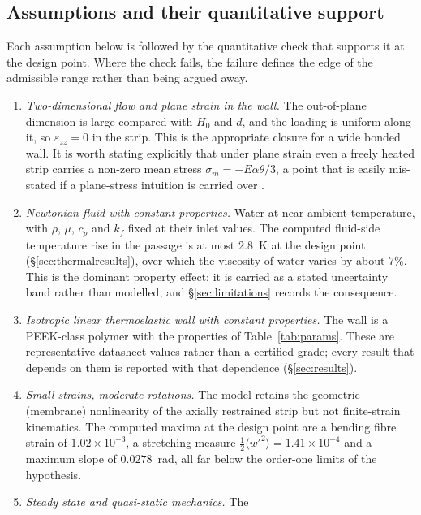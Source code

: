 \documentclass[11pt,a4paper]{article}
\newcommand{\eps}{\varepsilon}
\begin{document}
\subsection{Assumptions and their quantitative support}
\label{sec:assumptions}

Each assumption below is followed by the quantitative check that supports it
at the design point. Where the check fails, the failure defines the edge of
the admissible range rather than being argued away.

\begin{enumerate}
\item[\textbf{A1}] \emph{Two-dimensional flow and plane strain in the wall.}
The out-of-plane dimension is large compared with $H_0$ and $d$, and the
loading is uniform along it, so $\eps_{zz}=0$ in the strip. This is the
appropriate closure for a wide bonded wall. It is worth stating explicitly
that under plane strain even a freely heated strip carries a non-zero mean
stress $\sigma_m=-E\alpha\theta/3$, a point that is easily mis-stated if a
plane-stress intuition is carried over \citep{boley1960theory,
timoshenko1970elasticity}.
\item[\textbf{A2}] \emph{Newtonian fluid with constant properties.} Water at
near-ambient temperature, with $\rho$, $\mu$, $c_p$ and $k_f$ fixed at their
inlet values. The computed fluid-side temperature rise in the passage is at
most $2.8$~K at the design point (\S\ref{sec:thermalresults}), over which the
viscosity of water varies by about $7\%$. This is the dominant property
effect; it is carried as a stated uncertainty band rather than modelled, and
\S\ref{sec:limitations} records the consequence.
\item[\textbf{A3}] \emph{Isotropic linear thermoelastic wall with constant
properties.} The wall is a PEEK-class polymer with the properties of
Table~\ref{tab:params}. These are representative datasheet values rather than
a certified grade; every result that depends on them is reported with that
dependence (\S\ref{sec:results}).
\item[\textbf{A4}] \emph{Small strains, moderate rotations.} The model retains
the geometric (membrane) nonlinearity of the axially restrained strip but not
finite-strain kinematics. The computed maxima at the design point are a
bending fibre strain of $1.02\times10^{-3}$, a stretching measure
$\tfrac12\langle w'^2\rangle=1.41\times10^{-4}$ and a maximum slope of
$0.0278$~rad, all far below the order-one limits of the hypothesis.
\item[\textbf{A5}] \emph{Steady state and quasi-static mechanics.} The

\end{enumerate}
\end{document}
